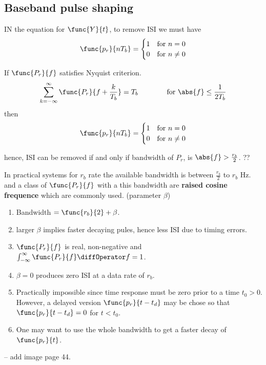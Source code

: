 \subsection{Baseband pulse shaping}
IN the equation for \(\func{Y}{t}\), to remove ISI we must have 
\begin{equation*}
    \func{p_r}{nT_b} = \begin{cases}
        1 & \text{for } n = 0\\
        0 & \text{for } n \neq 0
    \end{cases}
\end{equation*}
\begin{theorem}
    If \(\func{P_r}{f}\) satisfies Nyquist criterion.
    \begin{equation*}
        \sum_{k = -\infty}^{\infty} \func{P_r}{f + \frac{k}{T_b}} = T_b \qquad \qquad \text{for } \abs{f} \leq \frac{1}{2T_b}
    \end{equation*}
    then 
    \begin{equation*}
        \func{p_r}{nT_b} = \begin{cases}
            1 & \text{for } n = 0\\
            0 & \text{for } n \neq 0
        \end{cases}
    \end{equation*}
\end{theorem}

hence, ISI can be removed if and only if bandwidth of \(P_r\), is \(\abs{f} > \frac{r_b}{2}\). ??

In practical systems for \(r_b\) rate the available bandwidth is between \(\frac{r_b}{2}\) to \(r_b\) Hz. and a class of \(\func{P_r}{f}\) with a this bandwidth are \textbf{raised cosine frequence} which are commonly used. (parameter \(\beta\))
\begin{enumerate}
    \item Bandwidth \(= \func{r_b}{2} + \beta\).
    \item larger \(\beta\) implies faster decaying pules, hence less ISI due to timing errors.
    \item \(\func{P_r}{f}\) is real, non-negative and \(\int_{-\infty}^{\infty} \func{P_r}{f} \diffOperator f = 1\).
    \item \(\beta =0\) produces zero ISI at a data rate of \(r_b\).
    \item Practically impossible since time response must be zero prior to a time \(t_0 > 0\). However, a delayed version \(\func{p_r}{t-t_d}\) may be chose so that \(\func{p_r}{t-t_d} = 0\) for \(t < t_0\).
    \item One may want to use the whole bandwidth to get a faster decay of \(\func{p_r}{t}\).
\end{enumerate}
-- add image page 44.


